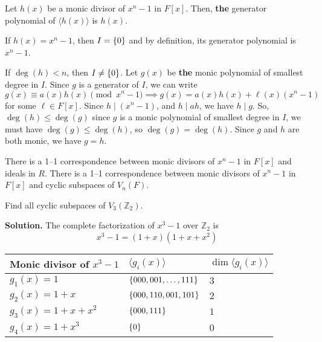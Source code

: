 \begin{Theorem}{}{}
    Let $ h(x) $ be a monic divisor of $ x^n-1 $ in $ F[x] $.
    Then, \textbf{the} generator polynomial of $ \langle h(x)\rangle $
    is $ h(x) $.
\end{Theorem}

\begin{Proof}{}{}
If $ h(x)=x^n-1 $, then $ I=\{0\} $ and by definition, its
generator polynomial is $ x^n-1 $.

If $ \deg(h)<n $, then $ I\neq \{0\} $. Let $ g(x) $
be \textbf{the} monic polynomial of smallest degree in $ I $.
Since $ g $ is a generator of $ I $, we can write
\[ g(x)\equiv a(x)h(x)\pmod{x^n-1}\implies g(x)=a(x)h(x)+\ell(x)(x^n-1) \]
for some $ \ell\in F[x] $. Since $ h\mid (x^n-1) $, and $ h\mid ah $,
we have $ h\mid g $. So, $ \deg(h)\leqslant \deg(g) $ since
$ g $ is a monic polynomial of smallest degree in $ I $,
we must have $ \deg(g)\leqslant \deg(h) $, so $ \deg(g)=\deg(h) $.
Since $ g $ and $ h $ are both monic, we have
$ g=h $.
\end{Proof}

\begin{Corollary}{}{}
    There is a 1--1 correspondence between monic
    divisors of $ x^n-1 $ in $ F[x] $ and ideals in $ R $.
    There is a 1--1 correspondence between monic
    divisors of $ x^n-1 $ in $ F[x] $ and cyclic
    subspaces of $ V_n(F) $.
\end{Corollary}

\begin{Example}{}{}
    Find all cyclic subspaces of $ V_3(\mathbb{Z}_2) $.

    \textbf{Solution.} The complete factorization
    of $ x^3-1 $ over $ \mathbb{Z}_2 $ is
    \[ x^3-1=(1+x)(1+x+x^2) \]

    \begin{table}[H]
        \centering
        \begin{tabularx}{0.8\linewidth}{@{}YYY@{}}
            Monic divisor of $ x^3-1 $ & $ \langle g_i(x) \rangle $    & $ \dim \langle g_i(x) \rangle $ \\
            \midrule
            \midrule
            $ g_1(x)=1 $               & $ \{000,001,\ldots ,111\} $ & $ 3 $                           \\
            \midrule
            $ g_2(x)=1+x $             & $ \{000,110,001,101\} $     & $ 2 $                           \\
            \midrule
            $ g_3(x)=1+x+x^2 $         & $ \{000,111\} $             & $ 1 $                           \\
            \midrule
            $ g_4(x)=1+x^3 $           & $ \{0\} $                   & $ 0 $                           \\
        \end{tabularx}
    \end{table}
\end{Example}
